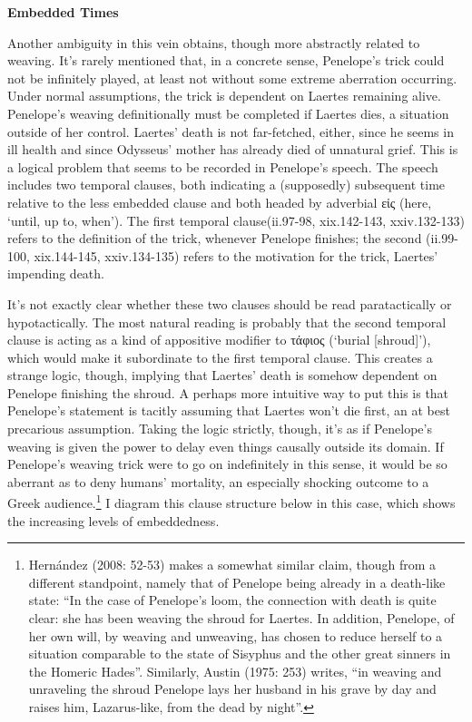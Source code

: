 \documentclass[12pt]{article}
\begin{document}
\noindent \hfill \par
\noindent \textbf{Embedded Times}

Another ambiguity in this vein obtains, though more abstractly related to weaving. It's rarely mentioned that, in a concrete sense, Penelope's trick could not be infinitely played, at least not without some extreme aberration occurring. Under normal assumptions, the trick is dependent on Laertes remaining alive. Penelope's weaving definitionally must be completed if Laertes dies, a situation outside of her control. Laertes' death is not far-fetched, either, since he seems in ill health and since Odysseus' mother has already died of unnatural grief. This is a logical problem that seems to be recorded in Penelope's speech. The speech includes two temporal clauses, both indicating a (supposedly) subsequent time relative to the less embedded clause and both headed by adverbial εἰς (here, `until, up to, when'). The first temporal clause(ii.97-98, xix.142-143, xxiv.132-133) refers to the definition of the trick, whenever Penelope finishes; the second (ii.99-100, xix.144-145, xxiv.134-135) refers to the motivation for the trick, Laertes' impending death.

It's not exactly clear whether these two clauses should be read paratactically or hypotactically. The most natural reading is probably that the second temporal clause is acting as a kind of appositive modifier to τάφιος (`burial [shroud]'), which would make it subordinate to the first temporal clause. This creates a strange logic, though, implying that Laertes' death is somehow dependent on Penelope finishing the shroud. A perhaps more intuitive way to put this is that Penelope's statement is tacitly assuming that Laertes won't die first, an at best precarious assumption. Taking the logic strictly, though, it's as if Penelope's weaving is given the power to delay even things causally outside its domain. If Penelope's weaving trick were to go on indefinitely in this sense, it would be so aberrant as to deny humans' mortality, an especially shocking outcome to a Greek audience.\footnote{ Hern\'{a}ndez (2008: 52-53) makes a somewhat similar claim, though from a different standpoint, namely that of Penelope being already in a death-like state: ``In the case of Penelope's loom, the connection with death is quite clear: she has been weaving the shroud for Laertes. In addition, Penelope, of her own will, by weaving and unweaving, has chosen to reduce herself to a situation comparable to the state of Sisyphus and the other great sinners in the Homeric Hades''. Similarly, Austin (1975: 253) writes, ``in weaving and unraveling the shroud Penelope lays her husband in his grave by day and raises him, Lazarus-like, from the dead by night''.} I diagram this clause structure below in this case, which shows the increasing levels of embeddedness.
\end{document}
